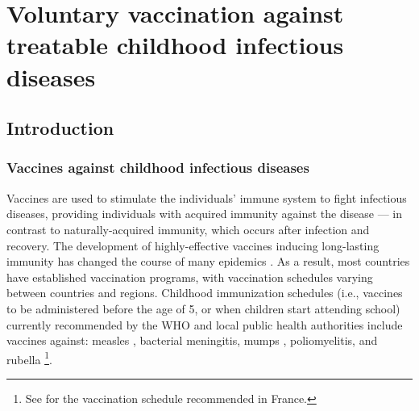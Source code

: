 \chapter{Voluntary vaccination against treatable childhood infectious diseases} 
\label{Vaccine}
\hypertarget{Vaccine}{}


\section{Introduction}
\label{Vaccine:Intro}
\subsection{Vaccines against childhood infectious diseases}
Vaccines are used to stimulate the individuals' immune system to fight infectious diseases, providing individuals with acquired immunity against the disease --- in contrast to naturally-acquired immunity, which occurs after infection and recovery. %
%
The development of highly-effective vaccines inducing long-lasting immunity has changed the course of many epidemics \cite[]{CDC_10achievements}. As a result, most countries have established vaccination programs, with vaccination schedules varying between countries and regions. Childhood immunization schedules (i.e., vaccines to be administered before the age of 5, or when children start attending school) currently recommended by the WHO and local public health authorities include vaccines against: measles%
, bacterial meningitis, mumps%
, poliomyelitis, and rubella%
 \cite[]{CDC_PinkBook}\footnote{See \cite[]{CalendrierVaccinal2019} for the vaccination schedule recommended in France.}. 

